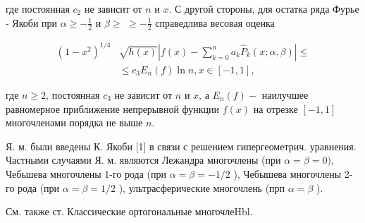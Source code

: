 \documentclass[10pt]{article}
\begin{document}
где постоянная $c_{2}$ не зависит от $n$ и $x$. С другой стороны, для остатка ряда Фурье - Якоби при $\alpha \geqslant-\frac{1}{2}$ и $\beta \geqslant$ $\geqslant-\frac{1}{2}$ справедлива весовая оценка



\[

\begin{aligned}

\left(1-x^{2}\right)^{1 / 4} & \sqrt{h(x)}\left|f(x)-\sum_{k=0}^{n} a_{k} \hat{P}_{k}(x ; \alpha, \beta)\right| \leqslant \\

& \leqslant c_{3} E_{n}(f) \ln n, x \in[-1,1],

\end{aligned}

\]



где $n \geqslant 2$, постоянная $c_{3}$ не зависит от $n$ и $x$, а $E_{n}(f)-$ наилучшее равномерное приближение непрерывной функции $f(x)$ на отрезке $[-1,1]$ многочленами порядка не выше $n$.



Я. м. были введены К. Якоби [1] в связи с решением гипергеометрич. уравнения. Частными случаями Я. м. являются Лежандра многочлены (при $\alpha=\beta=0)$, Чебьшева многочлены 1-го рода (при $\alpha=\beta=-1 / 2$ ), Чебышева многочлены 2-го рода (при $\alpha=\beta=1 / 2$ ), ультрасферические многочлень (прп $\alpha=\beta$ ).



См. также ст. Классические ортогональные многочлеHbl.
\end{document}
